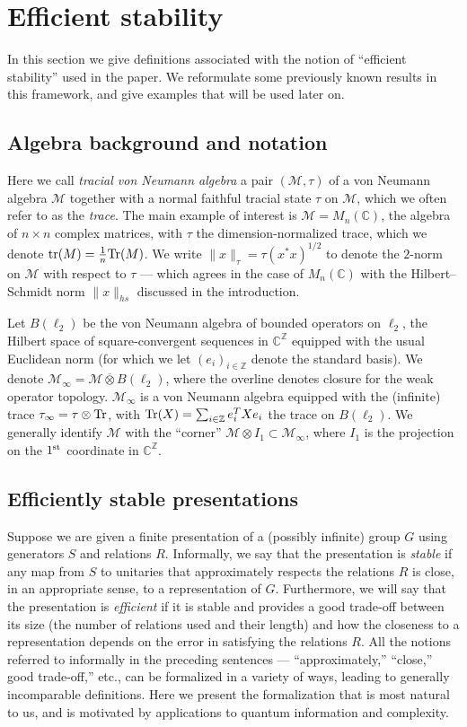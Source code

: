 \documentclass[11pt]{article}
\theoremstyle{definition}
\newcommand{\Tr}{\mbox{\rm Tr}}
\newcommand{\Id}{\ensuremath{I}}
\newcommand{\C}{\ensuremath{\mathbb{C}}}
\newcommand{\complex}{\ensuremath{\mathbb{C}}}
\newcommand{\Z}{\ensuremath{\mathbb{Z}}}
\newcommand{\mM}{\ensuremath{\mathcal{M}}}
\DeclareMathOperator{\tr}{tr}
\begin{document}
\section{Efficient stability}
\label{sec:efficient}

In this section we give definitions associated with the notion of ``efficient stability'' used in the paper. We reformulate some previously known results in this framework, and give examples that will be used later on. 


\subsection{Algebra background and notation}

  Here we call \emph{tracial von Neumann algebra} a pair $(\mM,\tau)$ of a von Neumann algebra $\mM$ together with a normal faithful tracial state $\tau$ on $\mM$, which we often refer to as the \emph{trace}. The main example of interest is $\mM=M_n(\C)$, the algebra of $n\times n$ complex matrices, with $\tau$ the dimension-normalized trace, which we denote $\tr(M)=\frac{1}{n}\Tr(M)$. 	We write $\|x\|_\tau=\tau(x^*x)^{1/2}$ to denote the $2$-norm on $\mM$ with respect to $\tau$ --- which agrees in the case of $M_n(\complex)$ with the Hilbert--Schmidt norm $\|x\|_{hs}$ discussed in the introduction.
	
	Let $B(\ell_2)$ be the von Neumann algebra of bounded operators on $\ell_2$, the Hilbert space of square-convergent sequences in $\C^\Z$ equipped with the usual Euclidean norm (for which we let $(e_i)_{i \in \Z}$ denote the standard basis). We denote $\mM_\infty = \mM \overline{\otimes} B(\ell_2)$, where the overline denotes closure for the weak operator topology. $\mM_\infty$ is a von Neumann algebra equipped with the (infinite) trace $\tau_\infty = \tau \otimes \Tr$, with $\Tr(X)=\sum_{i\in \Z} e_i^T X e_i$ the trace on $B(\ell_2)$. We generally identify $\mM$ with the ``corner'' $\mM\otimes \Id_{1}\subset \mM_\infty$, where $\Id_1$ is the projection on the $1^{\rm st}$ coordinate in $\complex^\Z$.

\subsection{Efficiently stable presentations}

Suppose we are given a finite presentation of a (possibly infinite) group $G$ using generators $S$ and relations $R$. Informally, we say that the presentation is \emph{stable} if any map from $S$ to unitaries that approximately respects the relations $R$ is close, in an appropriate sense, to a representation of $G$. Furthermore, we will say that the presentation is \emph{efficient} if it is stable and provides a good trade-off between its size (the number of relations used and their length) and how the closeness to a representation depends on the error in satisfying the relations $R$. All the notions referred to informally in the preceding sentences --- ``approximately,'' ``close,'' good trade-off,'' etc., can be formalized in a variety of ways, leading to generally incomparable definitions. Here we present the formalization that is most natural to us, and is motivated by applications to quantum information and complexity. 
\end{document}
